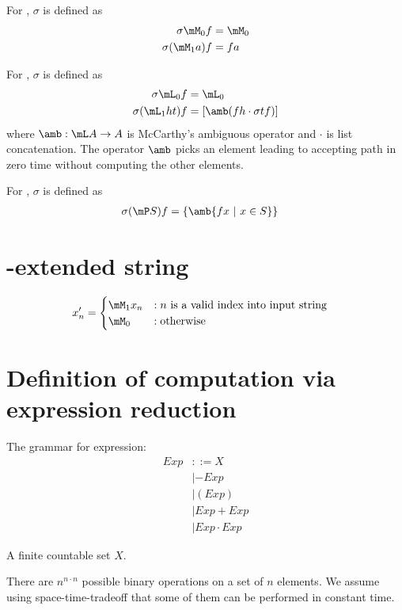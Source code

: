 For \mM, $\sigma$ is defined as
\begin{align}
    \sigma \mM_0 f &= \mM_0
    \\ \sigma (\mM_1 a) f &= fa
\end{align}

For \mL, $\sigma$ is defined as
\begin{align}
    \sigma \mL_0 f &= \mL_0
    \\ \sigma (\mL_1 h t) f &= [\amb (fh \cdot \sigma tf)]
\end{align}
where $\amb : \mL A \to A$ is McCarthy's ambiguous operator
and $\cdot$ is list concatenation.
The operator $\amb$ picks an element leading to accepting path
in zero time without computing the other elements.

For \mP, $\sigma$ is defined as
\begin{align}
    \sigma (\mP S) f &= \{ \amb \{ f x ~|~ x \in S \} \}
\end{align}

\section{\mM-extended string}

\begin{align*}
    x_n' &= \begin{cases}
 \mM_1 x_n &: n \text{ is a valid index into input string} 
  \\ \mM_0 &: \text{otherwise}
\end{cases}
\end{align*}

\section{Definition of computation via expression reduction}

The grammar for expression:
\begin{align}
    Exp &::= X
      \\ &| -Exp
      \\ &| (Exp)
      \\ &| Exp + Exp
      \\ &| Exp \cdot Exp
\end{align}

A finite countable set $X$.

There are $n^{n \cdot n}$ possible binary operations on a set of $n$ elements.
We assume using space-time-tradeoff that some of them can be performed in constant time.

